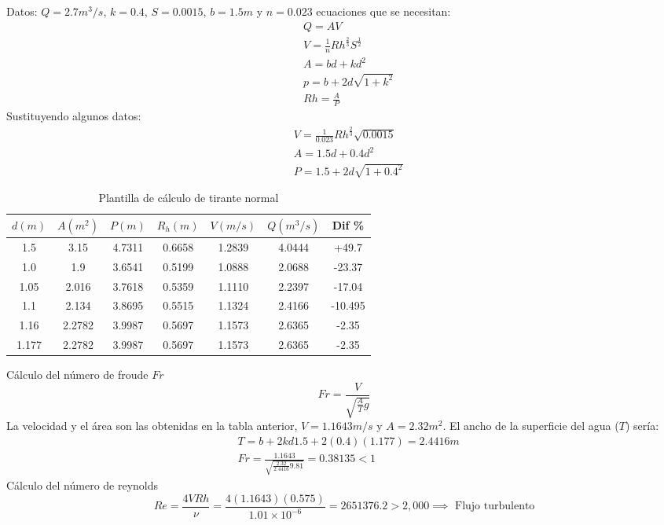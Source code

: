 Datos:
$Q=2.7m^3/s$, $k=0.4$, $S=0.0015$, $b=1.5m$ y $n=0.023$
ecuaciones que se necesitan:
\begin{align*}
    &Q = AV\\
    &V = \frac{1}{n}Rh^{\frac{2}{3}}S^{\frac{1}{2}}\\
    &A = bd + kd^2\\
    &p = b + 2d \sqrt{1 + k^2}\\
    &Rh = \frac{A}{P}
\end{align*}
Sustituyendo algunos datos:
\begin{align*}
    &V = \frac{1}{0.023}Rh^{\frac{2}{3}}\sqrt{0.0015}\\
    &A = 1.5d +0.4d^2\\
    &P =1.5 + 2d \sqrt{1 +0.4^2}
\end{align*}
\begin{table}[h!]
    \centering
    \begin{tabular}{@{}ccccccc@{}}
    \toprule
    $d(m)$ & $A(m^2)$ & $P(m)$ & $R_h(m)$ & $V(m/s)$ & $Q(m^3/s)$ & Dif \%  \\ \midrule
    1.5    & 3.15     & 4.7311 & 0.6658   & 1.2839   & 4.0444     & +49.7   \\
    1.0    & 1.9      & 3.6541 & 0.5199   & 1.0888   & 2.0688     & -23.37  \\
    1.05   & 2.016    & 3.7618 & 0.5359   & 1.1110   & 2.2397     & -17.04  \\
    1.1    & 2.134    & 3.8695 & 0.5515   & 1.1324   & 2.4166     & -10.495 \\
    1.16   & 2.2782   & 3.9987 & 0.5697   & 1.1573   & 2.6365     & -2.35   \\
    1.177  & 2.2782   & 3.9987 & 0.5697   & 1.1573   & 2.6365     & -2.35   \\ \bottomrule
    \end{tabular}
    \caption{Plantilla de cálculo de tirante normal}
    \label{tabhb32}
\end{table}
Cálculo del número de froude $Fr$
\begin{equation}
    Fr = \frac{V}{\sqrt{\frac{A}{T}g}}
\end{equation}
La velocidad y el área son las obtenidas en la tabla anterior, $V=1.1643m/s$ y $A=2.32m^2$. El ancho de la superficie del agua ($T$) sería:
\begin{align*}
    &T = b + 2kd 1.5 + 2(0.4)(1.177) = 2.4416m\\
    &Fr = \frac{1.1643}{\sqrt{\frac{2.32}{2.4416}9.81}} = 0.38135 < 1
\end{align*}
Cálculo del número de reynolds
\begin{equation*}
    Re = \frac{4VRh}{\nu} = \frac{4(1.1643)(0.575)}{1.01\times 10^{ - 6}} = 2651376.2 > 2,000\implies \text{ Flujo turbulento}
\end{equation*}

